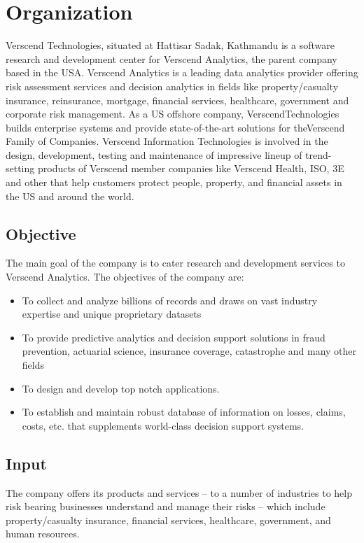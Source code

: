 \section{Organization}
Verscend Technologies, situated at Hattisar Sadak, Kathmandu is a software research and development center for Verscend Analytics, the parent company based in the USA. Verscend Analytics is a leading data analytics provider offering risk assessment services and decision analytics in fields like property/casualty insurance, reinsurance, mortgage, financial services, healthcare, government and corporate risk management. As a US offshore company, VerscendTechnologies builds enterprise systems and provide state-of-the-art solutions for theVerscend Family of Companies. Verscend Information Technologies is involved in the design, development, testing and maintenance of impressive lineup of trend-setting products of Verscend member companies like Verscend Health, ISO, 3E and other that help customers protect people, property, and financial assets in the US and around the world.
\subsection{Objective}
The main goal of the company is to cater research and development services to Verscend Analytics. The
objectives of the company are:
\begin{itemize}
\item To collect and analyze billions of records and draws on vast industry expertise and unique proprietary
datasets
\item To provide predictive analytics and decision support solutions in fraud prevention, actuarial science,
insurance coverage, catastrophe and many other fields
\item To design and develop top notch applications.
\item To establish and maintain robust database of information on losses, claims, costs, etc. that supplements
world-class decision support systems.
\end{itemize}
\subsection{Input}
The company offers its products and services – to a number of industries to help risk bearing businesses
understand and manage their risks – which include property/casualty insurance, financial services, healthcare,
government, and human resources.
